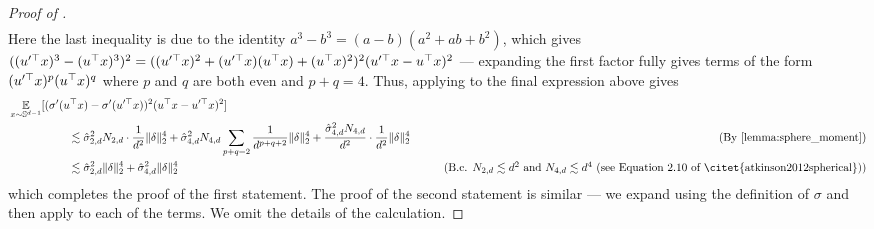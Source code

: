 \begin{proof}[Proof of ]
\begin{align}
    \end{align}
    Here the last inequality is due to the identity $a^3 - b^3 = (a - b)(a^2 + ab + b^2)$, which gives $((u'^\top x)^3 - (u^\top x)^3)^2 = ((u'^\top x)^2 + (u'^\top x)(u^\top x) + (u^\top x)^2)^2 (u'^\top x - u^\top x)^2$ --- expanding the first factor fully gives terms of the form $(u'^\top x)^p (u^\top x)^q$ where $p$ and $q$ are both even and $p + q = 4$. Thus, applying  to the final expression above gives
    \begin{align}
    & \E_{x \sim \bbS^{d - 1}} [(\sigma'(\u^\top x) - \sigma'(\u'^\top x))^2 (\u^\top x - \u'^\top x)^2] \\
    & \nextlinespace\nextlinespace \lesssim \sigmaCoeffTwo^2 N_{2, d} \cdot \frac{1}{d^2} \|\vv\|_2^4 + \sigmaCoeffFour^2 N_{4, d} \sum_{p + q = 2} \frac{1}{d^{p + q + 2}} \|\vv\|_2^4 + \frac{\sigmaCoeffFour^2 N_{4, d}}{d^2} \cdot \frac{1}{d^2} \|\vv\|_2^4
    & \tag{By \Cref{lemma:sphere_moment}} \\
    & \nextlinespace\nextlinespace \lesssim \sigmaCoeffTwo^2 \|\vv\|_2^4 + \sigmaCoeffFour^2 \|\vv\|_2^4
    & \tag{B.c. $N_{2, d} \lesssim d^2$ and $N_{4, d} \lesssim d^4$ (see Equation 2.10 of \citet{atkinson2012spherical})}
    \end{align}
which completes the proof of the first statement. The proof of the second statement is similar --- we expand using the definition of $\sigma$ and then apply  to each of the terms. We omit the details of the calculation.
\end{proof}

